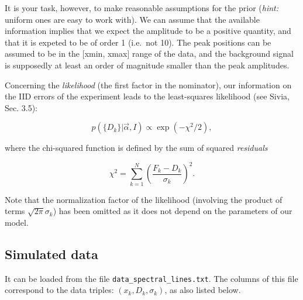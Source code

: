 \documentclass{article}
\begin{document}
    It is your task, however, to make reasonable assumptions for the prior
(\emph{hint:} uniform ones are easy to work with). We can assume that
the available information implies that we expect the amplitude to be a
positive quantity, and that it is expeted to be of order 1 (i.e.~not
10). The peak positions can be assumed to be in the {[}xmin, xmax{]}
range of the data, and the background signal is supposedly at least an
order of magnitude smaller than the peak amplitudes.

    Concerning the \emph{likelihood} (the first factor in the nominator),
our information on the IID errors of the experiment leads to the
least-squares likelihood (see Sivia, Sec. 3.5):

\[ p(\{D_k\} | \vec{\alpha}, I) \propto \exp(-\chi^2/2),\]

where the chi-squared function is defined by the sum of squared
\emph{residuals}

\[ \chi^2 = \sum_{k=1}^N \left( \frac{F_k - D_k}{\sigma_k} \right)^2.\]

Note that the normalization factor of the likelihood (involving the
product of terms \(\sqrt{2\pi}\sigma_k\)) has been omitted as it does
not depend on the parameters of our model.

\subsection*{Simulated data}

It can be
loaded from the file \texttt{data\_spectral\_lines.txt}. The columns
of this file correspond to the data triples: $(x_k, D_k, \sigma_k)$, as
also listed below.
    
\end{document}
